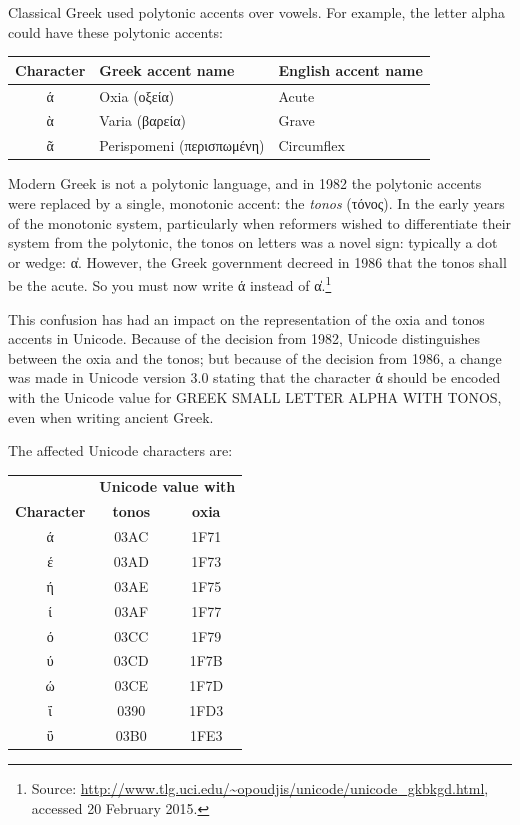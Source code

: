 \documentclass[11pt,oneside,a4paper]{memoir}
\begin{document}
Classical Greek used polytonic accents over vowels. For example, the letter alpha could have these
polytonic accents:

\begin{center}
  \begin{tabular}{@{}cll@{}}
    \toprule
    \textbf{Character} & \textbf{Greek accent name} & \textbf{English accent name}\\
    \midrule
    ά & Oxia (οξεία) & Acute\\
    ὰ & Varia (βαρεία) & Grave\\
    ᾶ & Perispomeni (περισπωμένη) & Circumflex\\
    \bottomrule
  \end{tabular}
\end{center}

Modern Greek is not a polytonic language, and in 1982 the polytonic accents were replaced by a
single, monotonic accent: the \emph{tonos} (τόνος). In the early years of the monotonic system,
particularly when reformers wished to differentiate their system from the polytonic, the tonos on
letters was a novel sign: typically a dot or wedge: α\hspace{-0.5mm}̍\hspace{0.5mm}. However, the Greek government decreed in 1986
that the tonos shall be the acute. So you must now write ά instead of α\hspace{-0.5mm}̍\hspace{0.5mm}.\footnote{Source:
  \url{http://www.tlg.uci.edu/~opoudjis/unicode/unicode_gkbkgd.html}, accessed 20 February 2015.}

This confusion has had an impact on the representation of the oxia and tonos accents in Unicode.
Because of the decision from 1982, Unicode distinguishes between the oxia and the tonos; but because
of the decision from 1986, a change was made in Unicode version 3.0 stating that the character ά
should be encoded with the Unicode value for GREEK SMALL LETTER ALPHA WITH TONOS, even when writing
ancient Greek.

The affected Unicode characters are:

\begin{center}
  \begin{tabular}{@{}ccc@{}}
    \toprule
    & \multicolumn{2}{c}{\textbf{Unicode value with}}\\
    \cmidrule{2-3}
    \textbf{Character} & \textbf{tonos} & \textbf{oxia}\\
    \midrule
    ά & 03AC & 1F71\\
    έ & 03AD & 1F73\\
    ή & 03AE & 1F75\\
    ί & 03AF & 1F77\\
    ό & 03CC & 1F79\\
    ύ & 03CD & 1F7B\\
    ώ & 03CE & 1F7D\\
    ΐ & 0390 & 1FD3\\
    ΰ & 03B0 & 1FE3\\
    \bottomrule
  \end{tabular}
\end{center}
\end{document}
